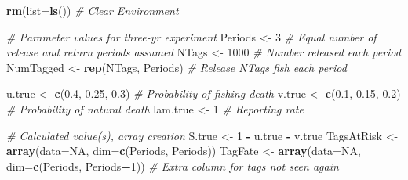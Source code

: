 \documentclass[
]{krantz}
\makeatletter
\newenvironment{Shaded}{\begin{snugshade}}{\end{snugshade}}
\newcommand{\AttributeTok}[1]{\textcolor[rgb]{0.27,0.27,0.27}{#1}}
\newcommand{\CommentTok}[1]{\textcolor[rgb]{0.37,0.37,0.37}{\textit{#1}}}
\newcommand{\ConstantTok}[1]{\textcolor[rgb]{0.37,0.37,0.37}{#1}}
\newcommand{\DecValTok}[1]{\textcolor[rgb]{0.06,0.06,0.06}{#1}}
\newcommand{\FloatTok}[1]{\textcolor[rgb]{0.06,0.06,0.06}{#1}}
\newcommand{\FunctionTok}[1]{\textcolor[rgb]{0.27,0.27,0.27}{\textbf{#1}}}
\newcommand{\NormalTok}[1]{#1}
\newcommand{\OtherTok}[1]{\textcolor[rgb]{0.37,0.37,0.37}{#1}}
\newcommand{\SpecialCharTok}[1]{\textcolor[rgb]{0.43,0.43,0.43}{\textbf{#1}}}
\newenvironment{kframe}{%
\medskip{}
\setlength{\fboxsep}{.8em}
 \def\at@end@of@kframe{}%
 \ifinner\ifhmode%
  \def\at@end@of@kframe{\end{minipage}}%
  \begin{minipage}{\columnwidth}%
 \fi\fi%
 \def\FrameCommand##1{\hskip\@totalleftmargin \hskip-\fboxsep
 \colorbox{shadecolor}{##1}\hskip-\fboxsep
     \hskip-\linewidth \hskip-\@totalleftmargin \hskip\columnwidth}%
 \MakeFramed {\advance\hsize-\width
   \@totalleftmargin\z@ \linewidth\hsize
   \@setminipage}}%
 {\par\unskip\endMakeFramed%
 \at@end@of@kframe}
\renewenvironment{Shaded}{\begin{kframe}}{\end{kframe}}
\makeatother
\begin{document}
\begin{Shaded}
\begin{Highlighting}[]
\FunctionTok{rm}\NormalTok{(}\AttributeTok{list=}\FunctionTok{ls}\NormalTok{()) }\CommentTok{\# Clear Environment}

\CommentTok{\# Parameter values for three{-}yr experiment}
\NormalTok{Periods }\OtherTok{\textless{}{-}} \DecValTok{3}  \CommentTok{\# Equal number of release and return periods assumed}
\NormalTok{NTags }\OtherTok{\textless{}{-}} \DecValTok{1000} \CommentTok{\# Number released each period}
\NormalTok{NumTagged }\OtherTok{\textless{}{-}} \FunctionTok{rep}\NormalTok{(NTags, Periods) }\CommentTok{\# Release NTags fish each period}

\NormalTok{u.true }\OtherTok{\textless{}{-}} \FunctionTok{c}\NormalTok{(}\FloatTok{0.4}\NormalTok{, }\FloatTok{0.25}\NormalTok{, }\FloatTok{0.3}\NormalTok{) }\CommentTok{\# Probability of fishing death}
\NormalTok{v.true }\OtherTok{\textless{}{-}} \FunctionTok{c}\NormalTok{(}\FloatTok{0.1}\NormalTok{, }\FloatTok{0.15}\NormalTok{, }\FloatTok{0.2}\NormalTok{) }\CommentTok{\# Probability of natural death}
\NormalTok{lam.true }\OtherTok{\textless{}{-}} \DecValTok{1}  \CommentTok{\# Reporting rate}

\CommentTok{\# Calculated value(s), array creation}
\NormalTok{S.true }\OtherTok{\textless{}{-}} \DecValTok{1} \SpecialCharTok{{-}}\NormalTok{ u.true }\SpecialCharTok{{-}}\NormalTok{ v.true}
\NormalTok{TagsAtRisk }\OtherTok{\textless{}{-}} \FunctionTok{array}\NormalTok{(}\AttributeTok{data=}\ConstantTok{NA}\NormalTok{, }\AttributeTok{dim=}\FunctionTok{c}\NormalTok{(Periods, Periods))}
\NormalTok{TagFate }\OtherTok{\textless{}{-}} \FunctionTok{array}\NormalTok{(}\AttributeTok{data=}\ConstantTok{NA}\NormalTok{, }\AttributeTok{dim=}\FunctionTok{c}\NormalTok{(Periods, Periods}\SpecialCharTok{+}\DecValTok{1}\NormalTok{))}
  \CommentTok{\# Extra column for tags not seen again}


\end{Highlighting}
\end{Shaded}
\end{document}
